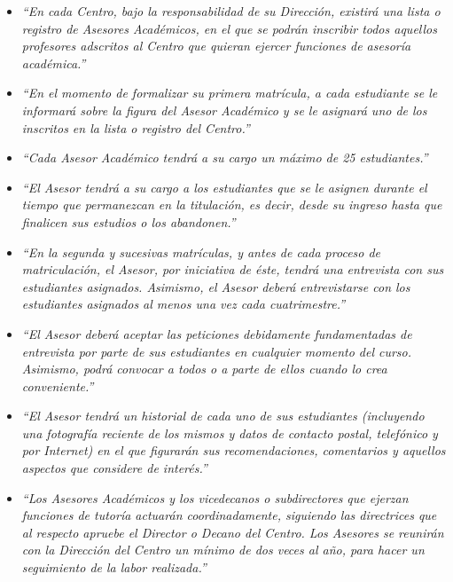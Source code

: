 \begin{itemize}
   \item \textit{``En cada Centro, bajo la responsabilidad de su Dirección,
   existirá una lista o registro de Asesores Académicos, en el que se podrán
   inscribir todos aquellos profesores adscritos al Centro que quieran ejercer
   funciones de asesoría académica.''}
   \item \textit{``En el momento de formalizar su primera matrícula, a cada
   estudiante se le informará sobre la figura del Asesor Académico y se le
   asignará uno de los inscritos en la lista o registro del Centro.''}
   \item \textit{``Cada Asesor Académico tendrá a su cargo un máximo de 25
   estudiantes.''}
   \item \textit{``El Asesor tendrá a su cargo a los estudiantes que se le
   asignen durante el tiempo que permanezcan en la titulación, es decir, desde
   su ingreso hasta que finalicen sus estudios o los abandonen.''}
   \item \textit{``En la segunda y sucesivas matrículas, y antes de cada proceso
   de matriculación, el Asesor, por iniciativa de éste, tendrá una entrevista
   con sus estudiantes asignados. Asimismo, el Asesor deberá entrevistarse con
   los estudiantes asignados al menos una vez cada cuatrimestre.''}
   \item \textit{``El Asesor deberá aceptar las peticiones debidamente
   fundamentadas de entrevista por parte de sus estudiantes en cualquier momento
   del curso. Asimismo, podrá convocar a todos o a parte de ellos cuando lo crea
   conveniente.''}
   \item \textit{``El Asesor tendrá un historial de cada uno de sus estudiantes
   (incluyendo una fotografía reciente de los mismos y datos de contacto postal,
   telefónico y por Internet) en el que figurarán sus recomendaciones,
   comentarios y aquellos aspectos que considere de interés.''}

   \item \textit{``Los Asesores Académicos y los vicedecanos o
   subdirectores que ejerzan funciones de tutoría actuarán coordinadamente,
   siguiendo las directrices que al respecto apruebe el Director o Decano del
   Centro. Los Asesores se reunirán con la Dirección del Centro un mínimo de dos
   veces al año, para hacer un seguimiento de la labor realizada.''}

\end{itemize}
